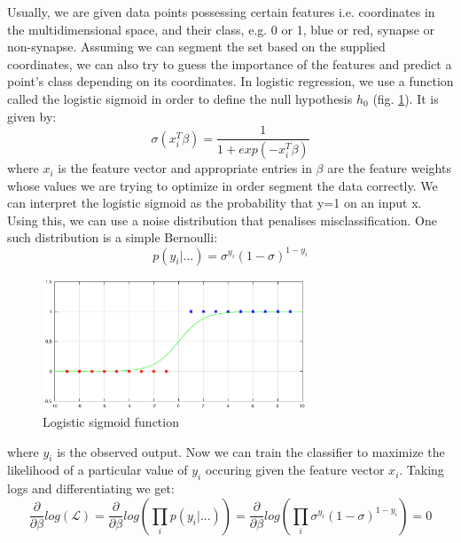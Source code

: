 \documentclass[a4paper, 11pt]{article}
\numberwithin{equation}{section}
\begin{document}
		\noindent Usually, we are given data points possessing certain features i.e. coordinates in the multidimensional space, and their class, e.g. 0 or 1, blue or red, synapse or non-synapse. Assuming we can segment the set based on the supplied coordinates, we can also try to guess the importance of the features and predict a point's class depending on its coordinates. In logistic regression, we use a function called the logistic sigmoid in order to define the null hypothesis $h_0$ (fig. \ref{fig:logistic_regression}). It is given by:
		\begin{equation}
		\sigma (x_i ^T \beta) = \frac{1}{1+exp(-x_i ^T \beta)}
		\end{equation}
		where $x_i$ is the feature vector and appropriate entries in $\beta$ are the feature weights whose values we are trying to optimize in order segment the data correctly. We can interpret the logistic sigmoid as the probability that y=1 on an input x. Using this, we can use a noise distribution that penalises misclassification. One such distribution is a simple Bernoulli:
		\begin{equation}
		p(y_i | ...) = \sigma ^ {y_i} (1-\sigma) ^ {1-y_i}
		\end{equation}
		
		\begin{figure}
			\centering
			\includegraphics[width=0.70\textwidth]{logistic_regression.eps}
			\caption{\label{fig:logistic_regression}{Logistic sigmoid function}}
		\end{figure}
		
		\noindent where $y_i$ is the observed output. Now we can train the classifier to maximize the likelihood of a particular value of $y_i$ occuring given the feature vector $x_i$. Taking logs and differentiating we get:
		\begin{equation}
		\frac{\partial}{\partial \beta} log(\mathcal{L}) = \frac{\partial}{\partial \beta} log (\prod_{i}^{} p(y_i | ...) ) = \frac{\partial}{\partial \beta} log (\prod_{i}^{} \sigma ^ {y_i} (1-\sigma) ^ {1-y_i}) = 0
		\end{equation}
		
\end{document}
